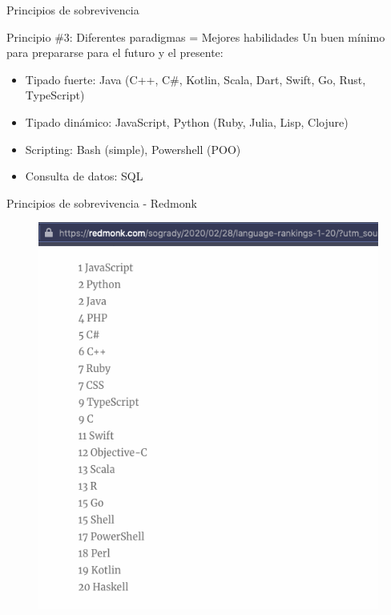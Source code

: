 \documentclass[aspectratio=169]{beamer}
\begin{document}
\begin{frame}{Principios de sobrevivencia}

	\begin{exampleblock}{Principio \#3: Diferentes paradigmas = Mejores habilidades}
    Un buen mínimo para prepararse para el futuro y el presente:
    \begin{itemize}
    	\item Tipado fuerte: Java (C++, C\#, Kotlin, Scala, Dart, Swift, Go, Rust, TypeScript)
        \item Tipado dinámico: JavaScript, Python (Ruby, Julia, Lisp, Clojure)
        \item Scripting: Bash (simple), Powershell (POO)
        \item Consulta de datos: SQL
   	\end{itemize}

	\end{exampleblock}
\end{frame}

\begin{frame}{Principios de sobrevivencia - Redmonk}
	\begin{figure}
		\centering
		\includegraphics[width=0.9\linewidth]{Images/redmonk}
	\end{figure}
\end{frame}
\end{document}
